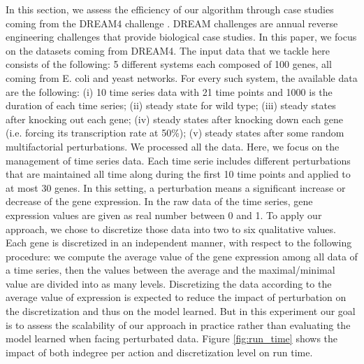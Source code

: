 	In this section, we assess the efficiency of our algorithm through case studies coming from the DREAM4 challenge \cite{prill2011crowdsourcing}.
	DREAM challenges are annual reverse engineering challenges that provide biological case studies.
	In this paper, we focus on the datasets coming from DREAM4.
	The input data that we tackle here consists of the following:
	5 different systems each composed of 100 genes, all coming from E. coli and yeast networks. For every such system,
	the available data are the following: (i) 10 time series data with 21 time points and 1000 is the duration of each time series; (ii) steady state for wild type;
	(iii) steady states after knocking out each gene;
	(iv) steady states after knocking down each gene (i.e. forcing its transcription rate at 50\%);
	(v) steady states after some random multifactorial perturbations. We processed all the data.
	Here, we focus on the management of time series data.
	Each time serie includes different perturbations that are maintained all time along during the first 10 time points and applied to at most 30 genes.
	In this setting, a perturbation means a significant increase or decrease of the gene expression.
	In the raw data of the time series, gene expression values are given as real number between 0 and 1.
	To apply our approach, we chose to discretize those data into two to six qualitative values.
	Each gene is discretized in an independent manner, with respect to the following procedure:
	we compute the average value of the gene expression among all data of a time series,
	then the values between the average and the maximal/minimal value are divided into as many levels.
	Discretizing the data according to the average value of expression is expected to reduce the impact of perturbation on the discretization and thus on the model learned.
	But in this experiment our goal is to assess the scalability of our approach in practice rather than evaluating the model learned when facing perturbated data.
	Figure \ref{fig:run_time} shows the impact of both indegree per action and discretization level on run time.


